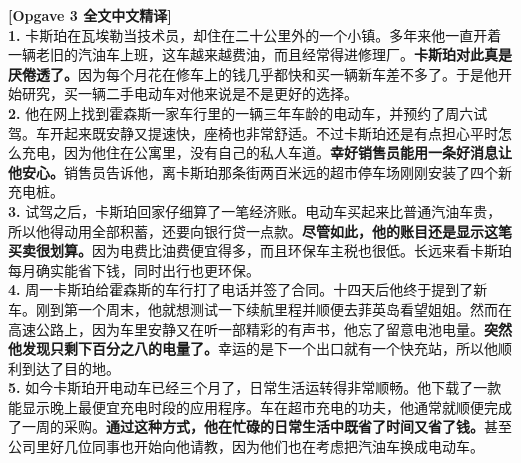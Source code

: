 \begin{answerbox}
\vspace{0.3em}
\textbf{\color{NCDTeal}[Opgave 3 全文中文精译]}\\
\textbf{1.} 卡斯珀在瓦埃勒当技术员，却住在二十公里外的一个小镇。多年来他一直开着一辆老旧的汽油车上班，这车越来越费油，而且经常得进修理厂。\textbf{卡斯珀对此真是厌倦透了。}因为每个月花在修车上的钱几乎都快和买一辆新车差不多了。于是他开始研究，买一辆二手电动车对他来说是不是更好的选择。\\
\textbf{2.} 他在网上找到霍森斯一家车行里的一辆三年车龄的电动车，并预约了周六试驾。车开起来既安静又提速快，座椅也非常舒适。不过卡斯珀还是有点担心平时怎么充电，因为他住在公寓里，没有自己的私人车道。\textbf{幸好销售员能用一条好消息让他安心。}销售员告诉他，离卡斯珀那条街两百米远的超市停车场刚刚安装了四个新充电桩。\\
\textbf{3.} 试驾之后，卡斯珀回家仔细算了一笔经济账。电动车买起来比普通汽油车贵，所以他得动用全部积蓄，还要向银行贷一点款。\textbf{尽管如此，他的账目还是显示这笔买卖很划算。}因为电费比油费便宜得多，而且环保车主税也很低。长远来看卡斯珀每月确实能省下钱，同时出行也更环保。\\
\textbf{4.} 周一卡斯珀给霍森斯的车行打了电话并签了合同。十四天后他终于提到了新车。刚到第一个周末，他就想测试一下续航里程并顺便去菲英岛看望姐姐。然而在高速公路上，因为车里安静又在听一部精彩的有声书，他忘了留意电池电量。\textbf{突然他发现只剩下百分之八的电量了。}幸运的是下一个出口就有一个快充站，所以他顺利到达了目的地。\\
\textbf{5.} 如今卡斯珀开电动车已经三个月了，日常生活运转得非常顺畅。他下载了一款能显示晚上最便宜充电时段的应用程序。车在超市充电的功夫，他通常就顺便完成了一周的采购。\textbf{通过这种方式，他在忙碌的日常生活中既省了时间又省了钱。}甚至公司里好几位同事也开始向他请教，因为他们也在考虑把汽油车换成电动车。


\end{answerbox}

